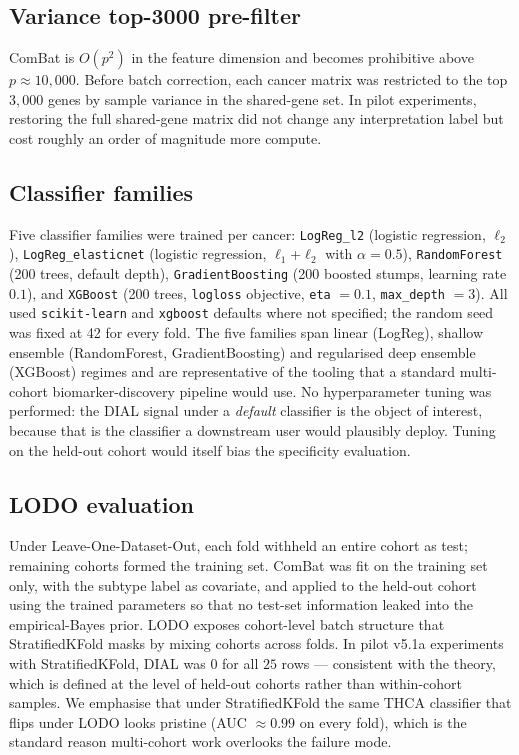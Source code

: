 \documentclass[11pt,a4paper]{article}
\begin{document}
\subsection{Variance top-3000 pre-filter}
ComBat is $O(p^2)$ in the feature dimension and becomes prohibitive
above $p \approx 10{,}000$. Before batch correction, each cancer
matrix was restricted to the top $3{,}000$ genes by sample variance
in the shared-gene set. In pilot experiments, restoring the full
shared-gene matrix did not change any interpretation label but
cost roughly an order of magnitude more compute.

\subsection{Classifier families}
Five classifier families were trained per cancer:
\texttt{LogReg\_l2} (logistic regression, $\ell_2$),
\texttt{LogReg\_elasticnet} (logistic regression,
$\ell_1$+$\ell_2$ with $\alpha = 0.5$),
\texttt{RandomForest} (200 trees, default depth),
\texttt{GradientBoosting} (200 boosted stumps, learning rate $0.1$),
and \texttt{XGBoost} \citep{chen2016xgboost} (200 trees,
\texttt{logloss} objective, \texttt{eta} $= 0.1$,
\texttt{max\_depth} $= 3$). All used \texttt{scikit-learn}
\citep{pedregosa2011sklearn} and \texttt{xgboost} defaults where not
specified; the random seed was fixed at 42 for every fold. The five
families span linear (LogReg), shallow ensemble (RandomForest,
GradientBoosting) and regularised deep ensemble (XGBoost) regimes
and are representative of the tooling that a standard multi-cohort
biomarker-discovery pipeline would use. No hyperparameter tuning was
performed: the DIAL signal under a \emph{default} classifier is the
object of interest, because that is the classifier a downstream user
would plausibly deploy. Tuning on the held-out cohort would itself
bias the specificity evaluation.

\subsection{LODO evaluation}
Under Leave-One-Dataset-Out, each fold withheld an entire cohort as
test; remaining cohorts formed the training set. ComBat was fit on
the training set only, with the subtype label as covariate, and
applied to the held-out cohort using the trained parameters so that
no test-set information leaked into the empirical-Bayes prior. LODO
exposes cohort-level batch structure that StratifiedKFold masks by
mixing cohorts across folds. In pilot v5.1a experiments with
StratifiedKFold, DIAL was $0$ for all $25$ rows --- consistent with
the theory, which is defined at the level of held-out cohorts rather
than within-cohort samples. We emphasise that under StratifiedKFold
the same THCA classifier that flips under LODO looks pristine
(AUC $\approx 0.99$ on every fold), which is the standard reason
multi-cohort work overlooks the failure mode.
\end{document}
